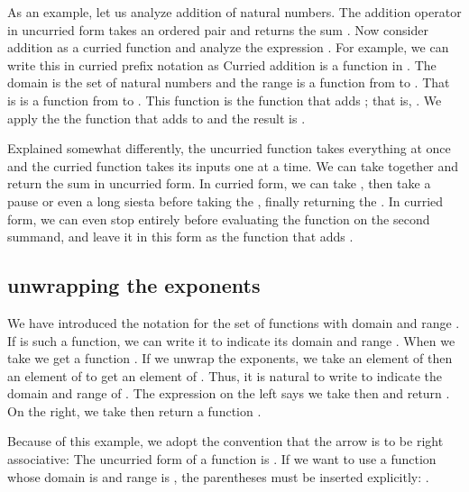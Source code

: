 \documentclass[cup9a]{cupbook}
\begin{document}
As an example, let us analyze addition of natural numbers.  The addition operator in uncurried form takes an ordered pair  and
returns the sum .   Now consider addition as a curried function and analyze the expression .  For example, we can write this in curried prefix notation as
Curried addition is a function in .  The domain
is the set of natural numbers and the range is a function from  to .
That is  is a function from  to .  This function is the function that adds ; that is, .  We apply the
the function that adds  to  and the result is .

Explained somewhat differently, the uncurried function takes everything at once and the curried function takes its inputs one at a time.  We can take  together and return the sum  in uncurried form.  In curried form, we can take , then take a pause or even a long siesta before taking the , finally returning the .  In curried form, we can even stop entirely before evaluating the function  on the second summand, and leave it in this form as the function that adds .

\subsection{unwrapping the exponents}

We have introduced the notation  for the set of functions with domain  and range .    If  is such a function, we can write it
 to indicate its domain  and range .  When we take
 we get a function .  If we unwrap the exponents, we
take an element of  then an element of  to get an element of .
Thus, it is natural to write
to indicate the domain and range of .  The expression on the left
says we take  then  and return .  On the
right, we take  then return a function .

Because of this example, we adopt the convention that the arrow \mc{$\to$}
is to be right associative:
The uncurried form of a function  is .
If we want to use a function  whose domain is  and range is ,
the parentheses must be inserted explicitly: .
\end{document}
